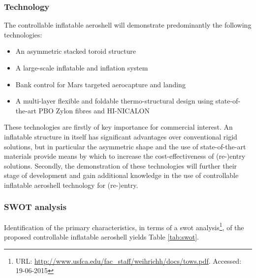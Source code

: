 \subsubsection{Technology}
The controllable inflatable aeroshell will demonstrate predominantly the following technologies:
\begin{itemize}
\item An asymmetric stacked toroid structure
\item A large-scale inflatable and inflation system
\item Bank control for Mars targeted aerocapture and landing
\item A multi-layer flexible and foldable thermo-structural design using state-of-the-art PBO Zylon fibres and HI-NICALON
\end{itemize}
These technologies are firstly of key importance for commercial interest. An inflatable structure in itself has significant advantages over conventional rigid solutions, but in particular the asymmetric shape and the use of state-of-the-art materials provide means by which to increase the cost-effectiveness of (re-)entry solutions. Secondly, the demonstration of these technologies will further their stage of development and gain additional knowledge in the use of controllable inflatable aeroshell technology for (re-)entry.


\subsubsection{SWOT analysis}
Identification of the primary characteristics, in terms of a \gls{swot} analysis\footnote{URL: \url{http://www.usfca.edu/fac_staff/weihrichh/docs/tows.pdf}. Accessed: 19-06-2015}, of the proposed controllable inflatable aeroshell yields Table \ref{tab:swot}.

